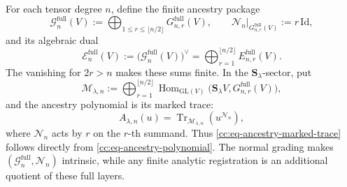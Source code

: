 \documentclass[10pt,reqno]{amsart}
\theoremstyle{plain}
\theoremstyle{definition}
\theoremstyle{remark}
\begin{document}
For each tensor degree \(n\), define the finite ancestry package
\begin{equation}
 \mathcal G_n^{\mathrm{full}}(V):=
 \bigoplus_{1\leq r\leq\lfloor n/2\rfloor}
 G^{\mathrm{full}}_{n,r}(V),
 \qquad
 \mathcal N_n|_{G^{\mathrm{full}}_{n,r}(V)}:=r\,\mathrm{Id},
 \label{cc:eq-finite-ancestry-package}
\end{equation}
and its algebraic dual
\begin{equation}
 \mathcal E_n^{\mathrm{full}}(V):=
 \bigl(\mathcal G_n^{\mathrm{full}}(V)\bigr)^{\vee}
 =\bigoplus_{r=1}^{\lfloor n/2\rfloor}
 E^{\mathrm{full}}_{n,r}(V).
 \label{cc:eq-finite-readout-package}
\end{equation}
The vanishing for \(2r>n\) makes these sums finite.  In the
\(\mathbf S_\lambda\)-sector, put
\begin{equation}
 \mathcal M_{\lambda,n}:=
 \bigoplus_{r=1}^{\lfloor n/2\rfloor}
 {\operatorname{Hom}}_{\mathrm{GL}(V)}
 \bigl(\mathbf S_\lambda V,G^{\mathrm{full}}_{n,r}(V)\bigr),
 \label{cc:eq-sector-multiplicity-space}
\end{equation}
and the ancestry polynomial is its marked trace:
\begin{equation}
 A_{\lambda,n}(u)
 =\operatorname{Tr}_{\mathcal M_{\lambda,n}}(u^{\mathcal N_n}),
 \label{cc:eq-ancestry-marked-trace}
\end{equation}
where \(\mathcal N_n\) acts by \(r\) on the \(r\)-th summand.  Thus
\eqref{cc:eq-ancestry-marked-trace} follows directly from
\eqref{cc:eq-ancestry-polynomial}.  The normal grading makes
\((\mathcal G_n^{\mathrm{full}},\mathcal N_n)\) intrinsic, while any
finite analytic registration is an additional quotient of these full
layers.
\end{document}

